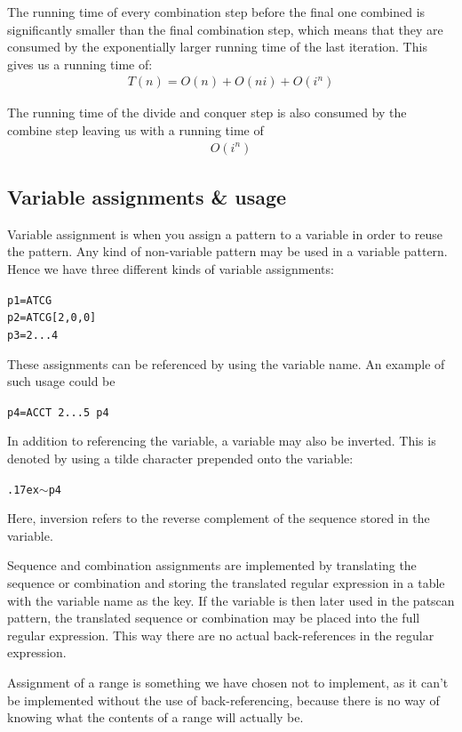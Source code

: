 \documentclass[12pt]{article}
\theoremstyle{definition}
\begin{document}
The running time of every combination step before the final one combined is significantly smaller than the final combination step, which means that they are consumed by the exponentially larger running time of the last iteration. This gives us a running time of:
\begin{eqnarray}
	T(n) = O(n) + O(ni) + O(i^n)
\end{eqnarray}

The running time of the divide and conquer step is also consumed by the combine step leaving us with a running time of
\begin{eqnarray}
	O(i^n)
\end{eqnarray}

\subsection{Variable assignments \& usage}

Variable assignment is when you assign a pattern to a variable in order to reuse the pattern. Any kind of non-variable pattern may be used in a variable pattern. Hence we have three different kinds of variable assignments:

\texttt{p1=ATCG} \\
\texttt{p2=ATCG[2,0,0]} \\
\texttt{p3=2...4}

These assignments can be referenced by using the variable name. An example of such usage could be

\texttt{p4=ACCT 2...5 p4}

In addition to referencing the variable, a variable may also be inverted. This is denoted by using a tilde character prepended onto the variable:

\texttt{{\raise.17ex\hbox{$\scriptstyle\mathtt{\sim}$}}p4}

Here, inversion refers to the reverse complement of the sequence stored in the variable.

Sequence and combination assignments are implemented by translating the sequence or combination and storing the translated regular expression in a table with the variable name as the key. If the variable is then later used in the patscan pattern, the translated sequence or combination may be placed into the full regular expression. This way there are no actual back-references in the regular expression.

Assignment of a range is something we have chosen not to implement, as it can't be implemented without the use of back-referencing, because there is no way of knowing what the contents of a range will actually be.
\end{document}

